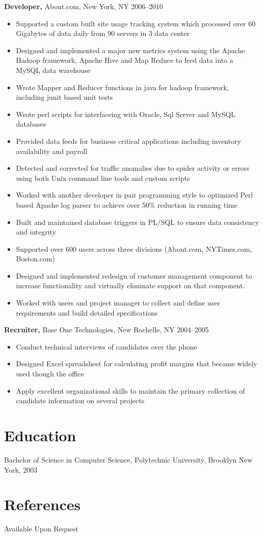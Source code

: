 \documentclass[margin]{res}
\begin{document}
\begin{resume}
{\bf Developer,} About.com, New York, NY \hfill  2006--2010
\begin{itemize}
  \item Supported a custom built site usage tracking system which processed over 60 Gigabytes of data daily from 90 servers in 3 data center
  \item Designed and implemented a major new metrics system using the Apache Hadoop framework, Apache Hive and Map Reduce to feed data into a MySQL data warehouse
  \item Wrote Mapper and Reducer functions in java for hadoop framework, including junit based unit tests
  \item Wrote perl scripts for interfaceing with Oracle, Sql Server and MySQL databases
  \item Provided data feeds for business critical applications including inventory availability and payroll
  \item Detected and corrected for traffic anomalies due to spider activity or errors using both Unix command line tools and custom scripts
  \item Worked with another developer in pair programming style to optimized Perl based Apache log parser to achieve over 50\% reduction in running time
  \item Built and maintained database triggers in PL/SQL to ensure data consistency and integrity
  \item Supported over 600 users across three divisions (About.com, NYTimes.com, Boston.com)
  \item Designed and implemented redesign of customer management component to increase functionality and virtually eliminate support on that component.
  \item Worked with users and project manager to collect and define user requirements and build detailed specifications
\end{itemize}

{\bf Recruiter,} Base One Technologies, New Rochelle, NY \hfill 2004--2005
\begin{itemize}
  \item Conduct technical interviews of candidates over the phone
  \item Designed Excel spreadsheet for calculating profit margins that became widely used though the office
  \item Apply excellent organizational skills to maintain the primary collection of candidate information on several projects
\end{itemize}

\section{Education}
Bachelor of Science in Computer Science, Polytechnic University, Brooklyn New
York, 2003

\section{References}
Available Upon Request

\end{resume}
\end{document}
